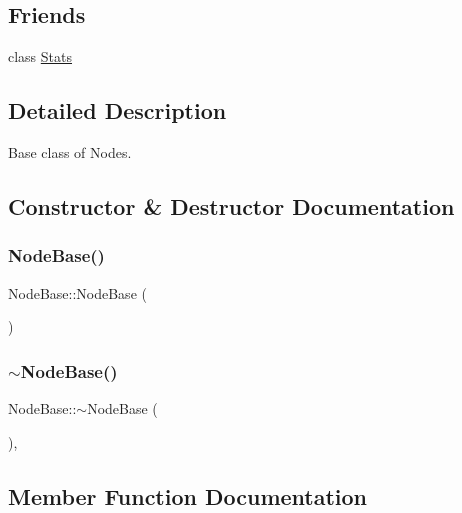 \subsection*{Friends}
\begin{DoxyCompactItemize}
\item 
class \hyperlink{class_node_base_a129f65b6976377739eb6231b6962985e}{Stats}
\end{DoxyCompactItemize}


\subsection{Detailed Description}
Base class of Nodes. 

\subsection{Constructor \& Destructor Documentation}
\mbox{\label{class_node_base_ab6ea4e77947d5b9b8da66d37dc432e7f}} 
\subsubsection{\texorpdfstring{Node\+Base()}{NodeBase()}}
{\footnotesize\ttfamily Node\+Base\+::\+Node\+Base (\begin{DoxyParamCaption}{ }\end{DoxyParamCaption})\hspace{0.3cm}{\ttfamily [protected]}}

\mbox{\label{class_node_base_a2fd7f7080282b6af95ba0b09fd30679d}} 
\subsubsection{\texorpdfstring{$\sim$\+Node\+Base()}{~NodeBase()}}
{\footnotesize\ttfamily Node\+Base\+::$\sim$\+Node\+Base (\begin{DoxyParamCaption}{ }\end{DoxyParamCaption})\hspace{0.3cm}{\ttfamily [protected]}, {\ttfamily [virtual]}}



\subsection{Member Function Documentation}
\mbox{\label{class_node_base_ac8b9e21b1cc32fd86aaa6c956b93a7c3}} 
